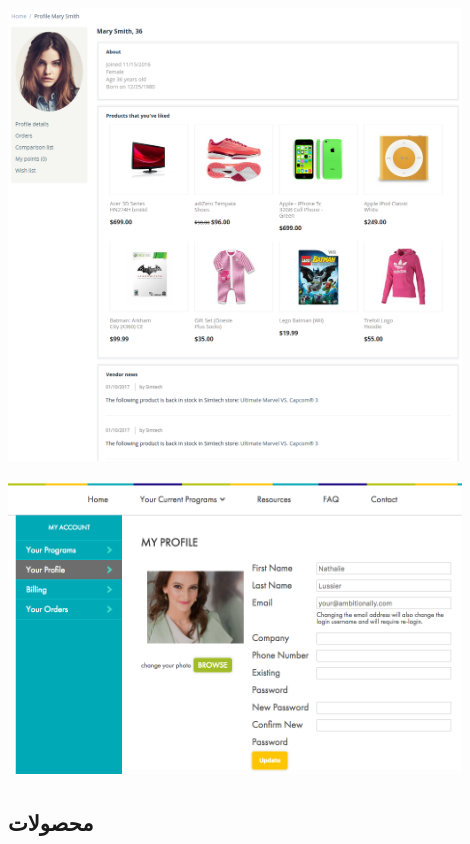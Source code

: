 \documentclass[]{article}
\begin{document}
\begin{center}
\includegraphics[width=0.9\textwidth]{images/image14.png}
\end{center}


\begin{center}
\includegraphics[width=0.9\textwidth]{images/image15.png}
\end{center}

\newpage

\subsection*{{\titr محصولات}}
\end{document}
